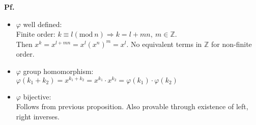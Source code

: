 \documentclass{article}
\begin{document}
\textbf{Pf.}\\
\begin{itemize}
\item $\varphi $ well defined:\\
Finite order: $k\equiv l (\mathrm{mod}~n)\Rightarrow k=l+mn,~m\in\mathbb{Z}.$\\
Then $x^k=x^{l+mn}=x^l(x^n)^m=x^l$. No equivalent terms in $\mathbb{Z}$ for non-finite order.
\item $\varphi$ group homomorphism:\\
$\varphi(k_1+k_2)=x^{k_1+k_2}=x^{k_1}\cdot x^{k_2}=\varphi(k_1)\cdot\varphi(k_2)$
\item  $\varphi$ bijective:\\
Follows from previous proposition. Also provable through existence of left, right inverses.
\end{itemize}
\end{document}
